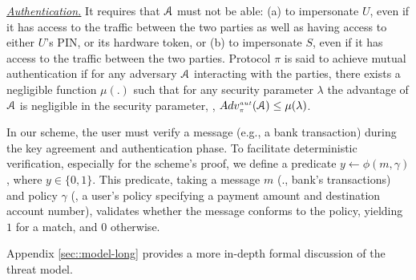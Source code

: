 

\noindent\underline{\textit{Authentication.}} It requires that $\mathcal{A}$ must not be able: (a)  to impersonate $U$, even if it has access to the traffic between the two parties as well as having access to either $U$'s PIN, or its hardware token, or (b) to impersonate  $S$, even if it has access to the traffic between the two parties.   Protocol $\pi$ is said to achieve mutual authentication if for any adversary $\mathcal{A}$  interacting with the parties, there exists a negligible function $\mu(.)$ such that for any security parameter $\lambda$ the advantage of $\mathcal{A}$  is negligible in the security parameter, \ie, 
%
$Adv_{\scriptscriptstyle\pi}^{\scriptscriptstyle aut}(\mathcal{A})\leq \mu(\lambda)$.

In our scheme, the user must verify a message (e.g., a bank transaction) during the key agreement and authentication phase. To facilitate deterministic verification, especially for the scheme's proof, we define a predicate $y\leftarrow \phi(m, \gamma)$, where $y\in \{0,1\}$. This predicate,  taking a message $m$ (\eg., bank's transactions) and  policy $\gamma$ (\eg, a user's policy specifying a payment amount and destination account number), validates whether the message conforms to the policy, yielding $1$ for a match, and $0$ otherwise. 


Appendix \ref{sec::model-long} provides a more in-depth formal discussion of the threat model. 










